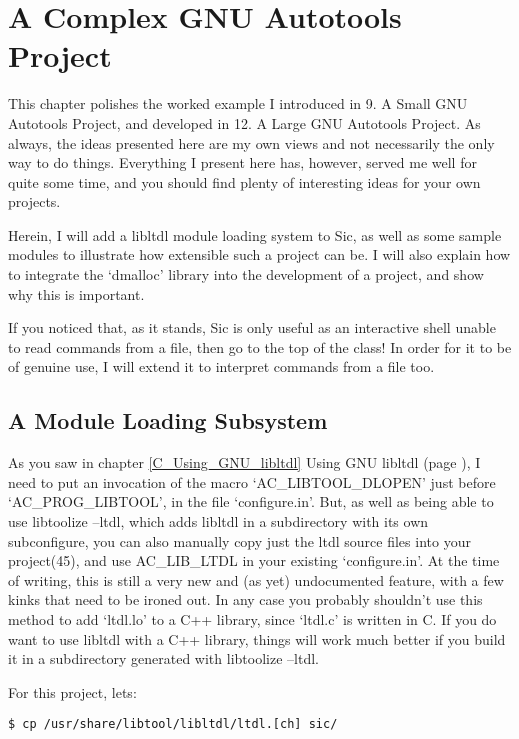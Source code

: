 \chapter{A Complex GNU Autotools Project}\label{C_A_Complex_GNU_Autotools_Project}

This chapter polishes the worked example I introduced in 9. A Small GNU Autotools Project, and developed in 12. A Large GNU Autotools Project. As always, the ideas presented here are my own views and not necessarily the only way to do things. Everything I present here has, however, served me well for quite some time, and you should find plenty of interesting ideas for your own projects.

Herein, I will add a libltdl module loading system to Sic, as well as some sample modules to illustrate how extensible such a project can be. I will also explain how to integrate the `dmalloc' library into the development of a project, and show why this is important.

If you noticed that, as it stands, Sic is only useful as an interactive shell unable to read commands from a file, then go to the top of the class! In order for it to be of genuine use, I will extend it to interpret commands from a file too. 

\section{A Module Loading Subsystem}

As you saw in chapter \ref{C_Using_GNU_libltdl} Using GNU libltdl
(page \pageref{C_Using_GNU_libltdl}), I need to put an invocation of the 
macro `AC\_{}LIBTOOL\_{}DLOPEN' just before `AC\_{}PROG\_{}LIBTOOL', in the 
file `configure.in'. But, as well as being able to use libtoolize --ltdl, which adds libltdl in a subdirectory with its own subconfigure, you can also manually copy just the ltdl source files into your project(45), and use AC\_{}LIB\_{}LTDL in your existing `configure.in'. At the time of writing, this is still a very new and (as yet) undocumented feature, with a few kinks that need to be ironed out. In any case you probably shouldn't use this method to add `ltdl.lo' to a C++ library, since `ltdl.c' is written in C. If you do want to use libltdl with a C++ library, things will work much better if you build it in a subdirectory generated with libtoolize --ltdl.

For this project, lets: 

\begin{Verbatim}[frame=single]
$ cp /usr/share/libtool/libltdl/ltdl.[ch] sic/
\end{Verbatim}

